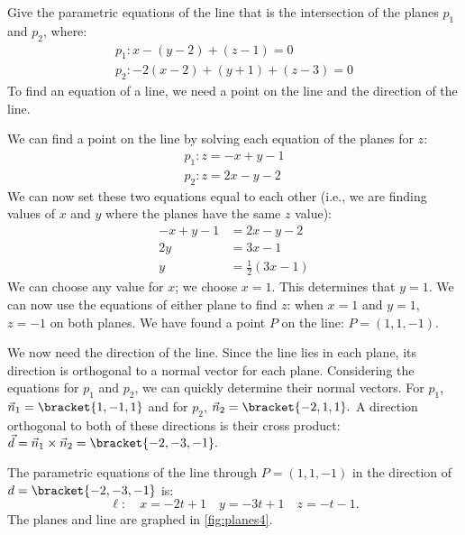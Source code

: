 \begin{example}\label{ex_planes4}%
Give the parametric equations of the line that is the intersection of the planes $p_1$ and $p_2$, where:
\begin{gather*}
p_1: x-(y-2)+(z-1) =0 \\
p_2: -2(x-2)+(y+1)+(z-3)=0
\end{gather*}
\solution
To find an equation of a line, we need a point on the line and the direction of the line. 

We can find a point on the line by solving each equation of the planes for $z$:
\begin{gather*}
p_1: z = -x+y-1 \\
p_2: z = 2x-y-2
\end{gather*}
We can now set these two equations equal to each other (i.e., we are finding values of $x$ and $y$ where the planes have the same $z$ value):
\begin{align*}
-x+y-1 &= 2x-y-2 \\
2y &= 3x-1\\
y &= \frac12(3x-1)
\end{align*}
We can choose any value for $x$; we choose $x=1$. This determines that $y=1$. We can now use the equations of either plane to find $z$: when $x=1$ and $y=1$, $z=-1$ on both planes. We have found a point $P$  on the line: $P= (1,1,-1)$. 

We now need the direction of the line. Since the line lies in each plane, its direction is orthogonal to a normal vector for each plane. Considering the equations for $p_1$ and $p_2$, we can quickly determine their normal vectors. For $p_1$, $\vec n_1 =\bracket{1,-1,1}$ and for $p_2$, $\vec n_2 =\bracket{-2,1,1}.$ A direction orthogonal to both of these directions is their cross product: $\vec d = \vec n_1\times \vec n_2 =\bracket{-2,-3,-1}.$


The parametric equations of the line through $P=(1,1,-1)$ in the direction of $d=\bracket{-2,-3,-1}$ is:
\[\ell: \quad x= -2t+1\quad y = -3t+1\quad z=-t-1.\]
The planes and line are graphed in \autoref{fig:planes4}.
\end{example}

